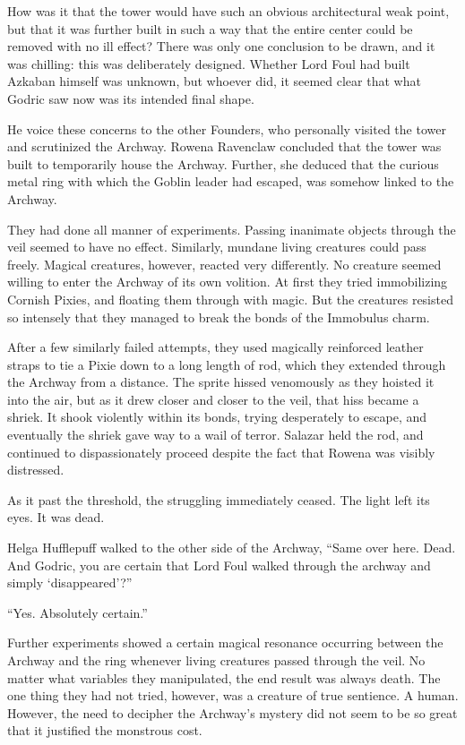 How was it that the tower would have such an obvious architectural weak point, but that it was further built in such a way that the entire center could be removed with no ill effect? There was only one conclusion to be drawn, and it was chilling: this was deliberately designed. Whether Lord Foul had built Azkaban himself was unknown, but whoever did, it seemed clear that what Godric saw now was its intended final shape.

He voice these concerns to the other Founders, who personally visited the tower and scrutinized the Archway. Rowena Ravenclaw concluded that the tower was built to temporarily house the Archway. Further, she deduced that the curious metal ring with which the Goblin leader had escaped, was somehow linked to the Archway.

They had done all manner of experiments. Passing inanimate objects through the veil seemed to have no effect. Similarly, mundane living creatures could pass freely. Magical creatures, however, reacted very differently. No creature seemed willing to enter the Archway of its own volition. At first they tried immobilizing Cornish Pixies, and floating them through with magic. But the creatures resisted so intensely that they managed to break the bonds of the Immobulus charm.

After a few similarly failed attempts, they used magically reinforced leather straps to tie a Pixie down to a long length of rod, which they extended through the Archway from a distance. The sprite hissed venomously as they hoisted it into the air, but as it drew closer and closer to the veil, that hiss became a shriek. It shook violently within its bonds, trying desperately to escape, and eventually the shriek gave way to a wail of terror. Salazar held the rod, and continued to dispassionately proceed despite the fact that Rowena was visibly distressed.

As it past the threshold, the struggling immediately ceased. The light left its eyes. It was dead.

Helga Hufflepuff walked to the other side of the Archway, “Same over here. Dead. And Godric, you are certain that Lord Foul walked through the archway and simply ‘disappeared’?”

“Yes. Absolutely certain.”

Further experiments showed a certain magical resonance occurring between the Archway and the ring whenever living creatures passed through the veil. No matter what variables they manipulated, the end result was always death. The one thing they had not tried, however, was a creature of true sentience. A human. However, the need to decipher the Archway’s mystery did not seem to be so great that it justified the monstrous cost.

